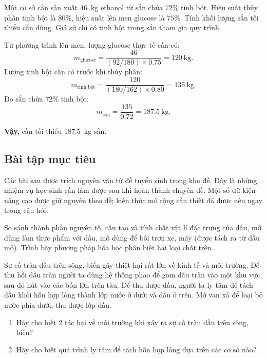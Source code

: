 \begin{tuluyen}
Một cơ sở cần sản xuất \SI{46}{\kilo\gram} ethanol từ sắn chứa $72\%$ tinh bột. Hiệu suất thủy phân tinh bột là $80\%$, hiệu suất lên men glucose là $75\%$. Tính khối lượng sắn tối thiểu cần dùng. Giả sử chỉ có tinh bột trong sắn tham gia quy trình.
\begin{loigiaiBT}
Từ phương trình lên men, lượng glucose thực tế cần có:
\[
m_{\text{glucose}}=\frac{46}{(92/180)\times0.75}
=\SI{120}{\kilo\gram}.
\]
Lượng tinh bột cần có trước khi thủy phân:
\[
m_{\text{tinh bột}}=\frac{120}{(180/162)\times0.80}
=\SI{135}{\kilo\gram}.
\]
Do sắn chứa $72\%$ tinh bột:
\[
m_{\text{sắn}}=\frac{135}{0.72}
=\SI{187.5}{\kilo\gram}.
\]

\textbf{Vậy,} cần tối thiểu \SI{187.5}{\kilo\gram} sắn.
\end{loigiaiBT}
\end{tuluyen}

\subsection{Bài tập mục tiêu}

Các bài sau được trích nguyên văn từ đề tuyển sinh trong kho đề. Đây là những nhiệm vụ học sinh cần làm được sau khi hoàn thành chuyên đề. Một số dữ kiện nâng cao được giữ nguyên theo đề; kiến thức mở rộng cần thiết đã được nêu ngay trong câu hỏi.

\begin{tuluyen}
So sánh thành phần nguyên tố, cấu tạo và tính chất vật lí đặc trưng của dầu, mỡ dùng làm thực phẩm với dầu, mỡ dùng để bôi trơn xe, máy (được tách ra từ dầu mỏ). Trình bày phương pháp hóa học phân biệt hai loại chất trên.

Sự cố tràn dầu trên sông, biển gây thiệt hại rất lớn về kinh tế và môi trường. Để thu hồi dầu tràn người ta dùng hệ thống phao để gom dầu tràn vào một khu vực, sau đó hút vào các bồn lớn trên tàu. Để thu được dầu, người ta ly tâm để tách dầu khỏi hỗn hợp lỏng thành lớp nước ở dưới và dầu ở trên. Mở van xả để loại bỏ nước phía dưới, thu được lớp dầu.
\begin{enumerate}
\item Hãy cho biết 2 tác hại về môi trường khi xảy ra sự cố tràn dầu trên sông, biển?
\item Hãy cho biết quá trình ly tâm để tách hỗn hợp lỏng dựa trên các cơ sở nào?
\end{enumerate}
\end{tuluyen}

